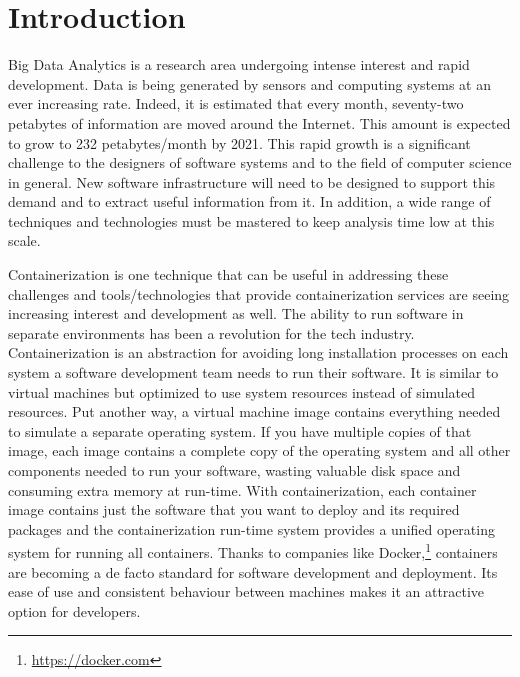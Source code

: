 
\chapter{Introduction} %

\label{Chapter1} %

Big Data Analytics is a research area undergoing intense interest and rapid development. Data is being generated by sensors and computing systems at an ever increasing rate. Indeed, it is estimated that every month, seventy-two petabytes of information are moved around the Internet.\parencite{ciscoreport} This amount is expected to grow to 232 petabytes/month by 2021.\parencite{ciscoreport} This rapid growth is a significant challenge to the designers of software systems and to the field of computer science in general. New software infrastructure will need to be designed to support this demand and to extract useful information from it. In addition, a wide range of techniques and technologies must be mastered to keep analysis time low at this scale. 

Containerization is one technique that can be useful in addressing these challenges and tools/technologies that provide containerization services are seeing increasing interest and development as well. The ability to run software in separate environments has been a revolution for the tech industry. Containerization is an abstraction for avoiding long installation processes on each system a software development team needs to run their software. It is similar to virtual machines but optimized to use system resources instead of simulated resources. Put another way, a virtual machine image contains everything needed to simulate a separate operating system. If you have multiple copies of that image, each image contains a complete copy of the operating system and all other components needed to run your software, wasting valuable disk space and consuming extra memory at run-time. With containerization, each container image contains just the software that you want to deploy and its required packages and the containerization run-time system provides a unified operating system for running all containers. Thanks to companies like Docker,\footnote{\href{https://docker.com}{https://docker.com}} containers are becoming a de facto standard for software development and deployment. Its ease of use and consistent behaviour between machines makes it an attractive option for developers.

